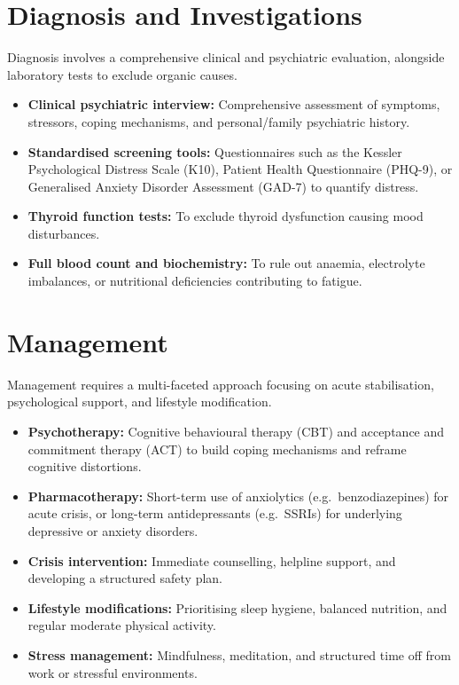 \section*{Diagnosis and Investigations}
Diagnosis involves a comprehensive clinical and psychiatric evaluation, alongside laboratory tests to exclude organic causes.
\begin{itemize}
    \item \textbf{Clinical psychiatric interview:} Comprehensive assessment of symptoms, stressors, coping mechanisms, and personal/family psychiatric history.
    \item \textbf{Standardised screening tools:} Questionnaires such as the Kessler Psychological Distress Scale (K10), Patient Health Questionnaire (PHQ-9), or Generalised Anxiety Disorder Assessment (GAD-7) to quantify distress.
    \item \textbf{Thyroid function tests:} To exclude thyroid dysfunction causing mood disturbances.
    \item \textbf{Full blood count and biochemistry:} To rule out anaemia, electrolyte imbalances, or nutritional deficiencies contributing to fatigue.
\end{itemize}

\section*{Management}
Management requires a multi-faceted approach focusing on acute stabilisation, psychological support, and lifestyle modification.
\begin{itemize}
    \item \textbf{Psychotherapy:} Cognitive behavioural therapy (CBT) and acceptance and commitment therapy (ACT) to build coping mechanisms and reframe cognitive distortions.
    \item \textbf{Pharmacotherapy:} Short-term use of anxiolytics (e.g.\ benzodiazepines) for acute crisis, or long-term antidepressants (e.g.\ SSRIs) for underlying depressive or anxiety disorders.
    \item \textbf{Crisis intervention:} Immediate counselling, helpline support, and developing a structured safety plan.
    \item \textbf{Lifestyle modifications:} Prioritising sleep hygiene, balanced nutrition, and regular moderate physical activity.
    \item \textbf{Stress management:} Mindfulness, meditation, and structured time off from work or stressful environments.
\end{itemize}


